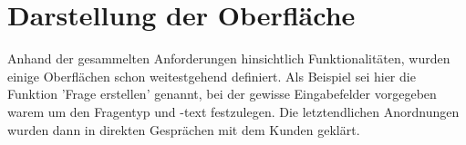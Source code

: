 \section{Darstellung der Oberfläche}
Anhand der gesammelten Anforderungen hinsichtlich Funktionalitäten, wurden einige Oberflächen schon weitestgehend definiert. 
Als Beispiel sei hier die Funktion 'Frage erstellen' genannt, bei der gewisse Eingabefelder vorgegeben warem um den Fragentyp und -text festzulegen.
Die letztendlichen Anordnungen wurden dann in direkten Gesprächen mit dem Kunden geklärt.
